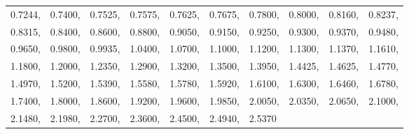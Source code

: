 \begin{longtable}[c]{p{0.5in}p{0.5in}p{0.5in}p{0.5in}p{0.5in}p{0.5in}p{0.5in}p{0.5in}p{0.5in}p{0.5in}}
0.7244, & 0.7400, & 0.7525, & 0.7575, & 0.7625, & 0.7675, & 0.7800, & 0.8000, & 0.8160, & 0.8237, \tabularnewline
0.8315, & 0.8400, & 0.8600, & 0.8800, & 0.9050, & 0.9150, & 0.9250, & 0.9300, & 0.9370, & 0.9480, \tabularnewline
0.9650, & 0.9800, & 0.9935, & 1.0400, & 1.0700, & 1.1000, & 1.1200, & 1.1300, & 1.1370, & 1.1610, \tabularnewline
1.1800, & 1.2000, & 1.2350, & 1.2900, & 1.3200, & 1.3500, & 1.3950, & 1.4425, & 1.4625, & 1.4770, \tabularnewline
1.4970, & 1.5200, & 1.5390, & 1.5580, & 1.5780, & 1.5920, & 1.6100, & 1.6300, & 1.6460, & 1.6780, \tabularnewline
1.7400, & 1.8000, & 1.8600, & 1.9200, & 1.9600, & 1.9850, & 2.0050, & 2.0350, & 2.0650, & 2.1000, \tabularnewline
2.1480, & 2.1980, & 2.2700, & 2.3600, & 2.4500, & 2.4940, & 2.5370 \tabularnewline
\bottomrule
\end{longtable}

